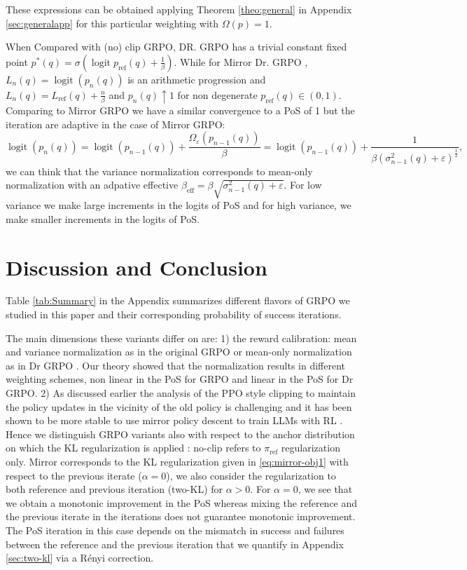 \documentclass[11pt,reqno]{amsart}
\DeclareMathOperator{\logit}{logit}
\begin{document}
These expressions can be obtained applying Theorem \ref{theo:general} in Appendix \ref{sec:generalapp} for this particular weighting with $\Omega(p)=1$. 

When Compared with (no) clip GRPO, DR. GRPO has a trivial constant fixed point $p^*(q)=\sigma(\logit p_{\mathrm{ref}}(q)+\frac{1}{\beta})$. While for Mirror Dr. GRPO , $L_{n}(q)= \logit( p_{n}(q))$ is an arithmetic progression and $L_{n}(q)= L_{\mathrm{ref}}(q)+ \frac{n}{\beta}$ and $p_{n}(q)\uparrow 1$ for non degenerate $p_{\mathrm{ref}}(q)\in (0,1)$. Comparing to Mirror GRPO we have a similar convergence to a PoS of 1 but the iteration are adaptive in the case of Mirror GRPO: 
\[ \logit(p_{n}(q)) = \logit (p_{n-1}(q)) + \frac{\Omega_{\varepsilon}(p_{n-1}(q))}{\beta }= \logit (p_{n-1}(q)) + \frac{1}{\beta (\sigma^2_{n-1}(q)+ \varepsilon)^{\frac{1}{2}}},\]
we can think that the variance normalization corresponds to mean-only normalization with an adpative effective $\beta_{\text{eff}}= \beta \sqrt{\sigma^2_{n-1}(q)+ \varepsilon}$. For low variance we make large increments in the logits of PoS and for high variance, we make smaller increments in the logits of PoS.  

\section{Discussion and Conclusion}
Table \ref{tab:Summary} in the Appendix summarizes different flavors of  GRPO  we studied in this paper and their corresponding probability of success iterations. 

The main dimensions these variants differ on are:  1) the reward calibration: mean and variance normalization as in the original GRPO or mean-only normalization  as in Dr GRPO \citep{liu2025understanding}. Our theory showed that the normalization results in different weighting schemes, non linear in the PoS for GRPO and linear in the PoS for Dr GRPO.  2)  As discussed earlier the analysis of the PPO style  clipping to maintain the policy updates in the vicinity of the old policy is challenging and it has been shown to be more stable to use mirror policy descent to train LLMs with RL \citep{gunter2024appleintelligencefoundationlanguage}. Hence we distinguish GRPO variants also with respect to the anchor distribution on which the KL regularization is applied : no-clip refers to $\pi_{\mathrm{ref}}$ regularization only. Mirror corresponds to the KL regularization given in \eqref{eq:mirror-obj1} with respect to the previous iterate ($\alpha=0$), we also consider the regularization to both reference and previous iteration (two-KL) for $\alpha>0$.  For $\alpha=0$, we see that we obtain a monotonic improvement in the PoS whereas mixing the reference and the previous iterate in the iterations  does not guarantee monotonic improvement. The PoS iteration in this case depends on the mismatch in success and failures between the reference and the previous iteration that we quantify in Appendix \ref{sec:two-kl} via a Rényi correction. 
\end{document}
